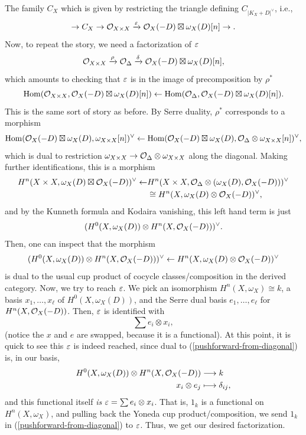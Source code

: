 \documentclass[12pt]{article}
\begin{document}
The family $C_X$ which is given by restricting the triangle defining $C_{|K_X+D|^\vee}$, i.e.,
\[\to C_X \to \mathcal{O}_{X\times X} \xrightarrow{\varepsilon} \mathcal{O}_X(-D) \boxtimes \omega_X(D)[n] \to .\]
Now, to repeat the story, we need a factorization of $\varepsilon$
\[\mathcal{O}_{X\times X} \xrightarrow{\rho} \mathcal{O}_\Delta \xrightarrow{\delta} \mathcal{O}_X(-D) \boxtimes \omega_X(D)[n],\]
which amounts to checking that $\varepsilon$ is in the image of precomposition by $\rho^*$
\[\mathrm{Hom}(\mathcal{O}_{X\times X},\mathcal{O}_X(-D)\boxtimes\omega_X(D)[n]) \leftarrow \mathrm{Hom}(\mathcal{O}_\Delta,\mathcal{O}_X(-D)\boxtimes\omega_X(D)[n]).\]
This is the same sort of story as before. By Serre duality, $\rho^*$ corresponds to a morphism
\[\mathrm{Hom}(\mathcal{O}_X(-D)\boxtimes\omega_X(D),\omega_{X\times X}[n])^\vee \leftarrow \mathrm{Hom}(\mathcal{O}_X(-D)\boxtimes\omega_X(D),\mathcal{O}_\Delta\otimes \omega_{X\times X}[n])^\vee,\]
which is dual to restriction $\omega_{X\times X} \to \mathcal{O}_\Delta \otimes \omega_{X\times X}$ along the diagonal. Making further identifications, this is a morphism
\begin{align*}
    H^n(X\times X, \omega_X(D)\boxtimes \mathcal{O}_X(-D))^\vee \leftarrow & H^n(X\times X, \mathcal{O}_\Delta \otimes (\omega_X(D),\mathcal{O}_X(-D)))^\vee\\
    &\cong H^n(X, \omega_X(D)\otimes \mathcal{O}_X(-D))^\vee,
\end{align*}
and by the Kunneth formula and Kodaira vanishing, this left hand term is just
\[(H^0(X,\omega_X(D)) \otimes H^n(X,\mathcal{O}_X(-D)))^\vee.\]
Then, one can inspect that the morphism
\begin{equation}\label{pushforward-from-diagonal} (H^0(X,\omega_X(D)) \otimes H^n(X,\mathcal{O}_X(-D)))^\vee \leftarrow H^n(X, \omega_X(D)\otimes \mathcal{O}_X(-D))^\vee
\end{equation}
is dual to the usual cup product of cocycle classes/composition in the derived category. Now, we try to reach $\varepsilon$. We pick an isomorphism $H^n(X,\omega_X)\cong k$, a basis $x_1,\dots,x_\ell$ of $H^0(X,\omega_X(D))$, and the Serre dual basis $e_1,\dots,e_\ell$ for $H^n(X,\mathcal{O}_X(-D))$. Then, $\varepsilon$ is identified with
\[\sum e_i\otimes x_i,\]
(notice the $x$ and $e$ are swapped, because it is a functional). At this point, it is quick to see this $\varepsilon$ is indeed reached, since dual to (\ref{pushforward-from-diagonal}) is, in our basis,
\begin{align*}
    H^0(X,\omega_X(D)) \otimes H^n(X,\mathcal{O}_X(-D)) &\longrightarrow k\\
    x_i\otimes e_j &\longmapsto \delta_{ij},
\end{align*}
and this functional itself \textit{is} $\varepsilon = \sum e_i\otimes x_i$. That is, $1_k$ is a functional on $H^n(X,\omega_X)$, and pulling back the Yoneda cup product/composition, we send $1_k$ in (\ref{pushforward-from-diagonal}) to $\varepsilon$. Thus, we get our desired factorization.
\end{document}
